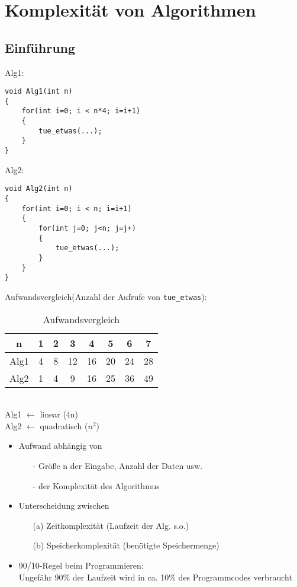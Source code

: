 \section{Komplexität von Algorithmen}
\subsection{Einführung}
Alg1:
\begin{lstlisting}
void Alg1(int n)
{
	for(int i=0; i < n*4; i=i+1)
	{
		tue_etwas(...);
	}
}
\end{lstlisting}
Alg2:
\begin{lstlisting}
void Alg2(int n)
{
	for(int i=0; i < n; i=i+1)
	{
		for(int j=0; j<n; j=j+)
		{
			tue_etwas(...);
		}
	}
}
\end{lstlisting}
Aufwandsvergleich(Anzahl der Aufrufe von \texttt{tue\_etwas}): \\
\begin{table}[h]
	\caption[Aufwandsvergleich der Algorithmen]{Aufwandsvergleich}
	\begin{center}
	\begin{tabular}{c|ccccccc}
		n & 1 & 2 & 3 & 4 & 5 & 6 & 7\\
		\hline
		Alg1 & 4 & 8 & 12 & 16 & 20 & 24 & 28\\
		Alg2 & 1 & 4 & 9 & 16 & 25 & 36 & 49\\
	\end{tabular}
	\end{center}
\end{table}
~\\
Alg1 $\longleftarrow$ linear (4n) \\
Alg2 $\longleftarrow$ quadratisch ($n^2$) \\
\begin{itemize}
\item Aufwand abhängig von
	\begin{itemize}
	\item[-] Größe n der Eingabe, Anzahl der Daten usw.
	\item[-] der Komplexität des Algorithmus
	\end{itemize}
\item Unterscheidung zwischen 
	\begin{itemize}
	\item[(a)] Zeitkomplexität (Laufzeit der Alg. s.o.)
	\item[(b)] Speicherkomplexität (benötigte Speichermenge)
	\end{itemize}
\item 90/10-Regel beim Programmieren: \\ 
\glqq Ungefähr 90\% der Laufzeit wird in ca. 10\% des Programmcodes verbraucht\grqq
\end{itemize}

